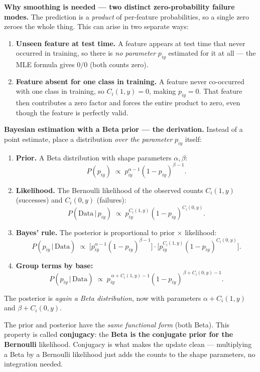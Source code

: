 \documentclass[11pt, a4paper]{article}
\begin{document}
\textbf{Why smoothing is needed — two distinct zero-probability failure modes.} The prediction is a \emph{product} of per-feature probabilities, so a single zero zeroes the whole thing. This can arise in two separate ways:
\begin{enumerate}
  \item \textbf{Unseen feature at test time.} A feature appears at test time that never occurred in training, so there is \emph{no parameter} $p_{iy}$ estimated for it at all — the MLE formula gives $0/0$ (both counts zero).
  \item \textbf{Feature absent for one class in training.} A feature never co-occurred with one class in training, so $C_i(1,y) = 0$, making $p_{iy} = 0$. That feature then contributes a zero factor and forces the entire product to zero, even though the feature is perfectly valid.
\end{enumerate}

\textbf{Bayesian estimation with a Beta prior — the derivation.} Instead of a point estimate, place a distribution \emph{over the parameter} $p_{iy}$ itself:
\begin{enumerate}
  \item \textbf{Prior.} A Beta distribution with shape parameters $\alpha, \beta$:
  \[
  P(p_{iy}) \;\propto\; p_{iy}^{\alpha-1}(1-p_{iy})^{\beta-1}.
  \]
  \item \textbf{Likelihood.} The Bernoulli likelihood of the observed counts $C_i(1,y)$ (successes) and $C_i(0,y)$ (failures):
  \[
  P(\text{Data}\,|\,p_{iy}) \;\propto\; p_{iy}^{C_i(1,y)}(1-p_{iy})^{C_i(0,y)}.
  \]
  \item \textbf{Bayes' rule.} The posterior is proportional to prior $\times$ likelihood:
  \[
  P(p_{iy}\,|\,\text{Data}) \;\propto\; \big[p_{iy}^{\alpha-1}(1-p_{iy})^{\beta-1}\big]\cdot\big[p_{iy}^{C_i(1,y)}(1-p_{iy})^{C_i(0,y)}\big].
  \]
  \item \textbf{Group terms by base:}
  \[
  P(p_{iy}\,|\,\text{Data}) \;\propto\; p_{iy}^{\,\alpha + C_i(1,y) - 1}(1-p_{iy})^{\,\beta + C_i(0,y) - 1}.
  \]
\end{enumerate}
The posterior is \emph{again a Beta distribution}, now with parameters $\alpha + C_i(1,y)$ and $\beta + C_i(0,y)$.

\begin{notebox}[: conjugacy]
The prior and posterior have the \emph{same functional form} (both Beta). This property is called \textbf{conjugacy}: the \textbf{Beta is the conjugate prior for the Bernoulli} likelihood. Conjugacy is what makes the update clean — multiplying a Beta by a Bernoulli likelihood just adds the counts to the shape parameters, no integration needed.
\end{notebox}
\end{document}
